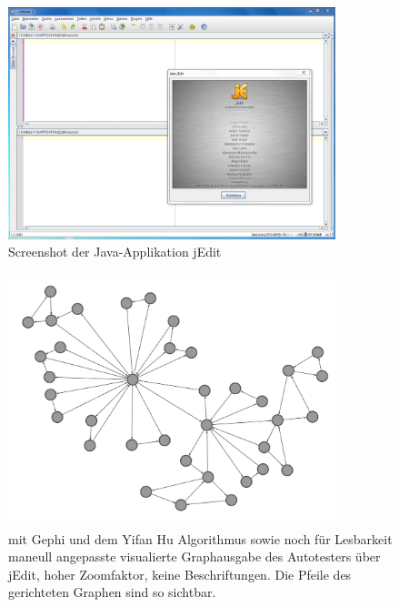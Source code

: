 \begin{figure}
	\centering
	\includegraphics[width=0.85\textwidth]{bilder/jedit_beispiel.png}
	\caption{Screenshot der Java-Applikation jEdit}
	\label{fig:screenshot_jedit}
\end{figure}

\begin{figure}
	\centering
	\includegraphics[width=0.85\textwidth]{bilder/model_jedit_notext.png}
	\caption{mit Gephi und dem Yifan Hu Algorithmus\cite{hu2005efficient}
    sowie noch für Lesbarkeit maneull angepasste visualierte Graphausgabe 
	des Autotesters über jEdit, hoher Zoomfaktor, keine Beschriftungen.
	Die Pfeile des gerichteten Graphen sind so sichtbar.}
	\label{fig:model_jedit_notext}
\end{figure}

